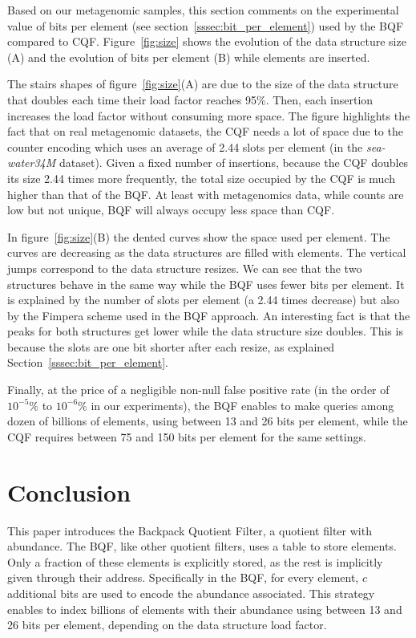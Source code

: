 Based on our metagenomic samples, this section comments on the experimental value of bits per element (see section~\ref{sssec:bit_per_element}) used by the BQF compared to CQF. Figure~\ref{fig:size} shows the evolution of the data structure size (A) and the evolution of bits per element (B) while elements are inserted.

The stairs shapes of figure~\ref{fig:size}(A) are due to the size of the data structure that doubles each time their load factor reaches 95\%. Then, each insertion increases the load factor without consuming more space.
The figure highlights the fact that on real metagenomic datasets, the CQF needs a lot of space due to the counter encoding which uses an average of 2.44 slots per element (in the \textit{sea-water34M} dataset). %
Given a fixed number of insertions, because the CQF doubles its size 2.44 times more frequently, the total size occupied by the CQF is much higher than that of the BQF. At least with metagenomics data, while counts are low but not unique, BQF will always occupy less space than CQF.

In figure~\ref{fig:size}(B) the dented curves show the space used per element. The curves are decreasing as the data structures are filled with elements. The vertical jumps correspond to the data structure resizes. We can see that the two structures behave in the same way while the BQF uses fewer bits per element. It is explained by the number of slots per element (a 2.44 times decrease) but also by the Fimpera scheme used in the BQF approach. An interesting fact is that the peaks for both structures get lower while the data structure size doubles. This is because the slots are one bit shorter after each resize, as explained Section~\ref{sssec:bit_per_element}.

Finally, at the price of a negligible non-null false positive rate (in the order of $10^{-5}$\% to $10^{-6}$\% in our experiments), the BQF enables to make queries among dozen of billions of elements, using between 13 and 26 bits per element, while the CQF requires between 75 and 150 bits per element for the same settings.

\section{Conclusion}

This paper introduces the Backpack Quotient Filter, a quotient filter with abundance. The BQF, like other quotient filters, uses a table to store elements. Only a fraction of these elements is explicitly stored, as the rest is implicitly given through their address. Specifically in the BQF, for every element, $c$ additional bits are used to encode the abundance associated. 
This strategy enables to index billions of elements with their abundance using between 13 and 26 bits per element, depending on the data structure load factor.

